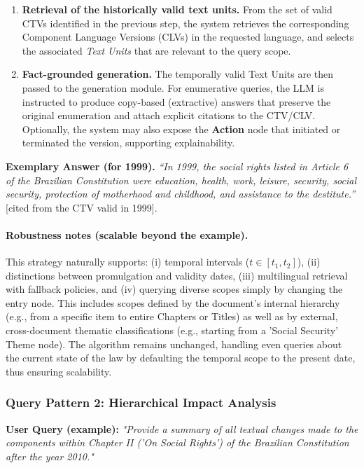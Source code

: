 \documentclass[11pt]{article}
\begin{document}
\begin{enumerate}
\item \textbf{Retrieval of the historically valid text units.}
From the set of valid CTVs identified in the previous step, the system retrieves the corresponding Component Language Versions (CLVs) in the requested language, and selects the associated \textit{Text Units} that are relevant to the query scope.

\item \textbf{Fact-grounded generation.}
The temporally valid Text Units are then passed to the generation module. For enumerative queries, the LLM is instructed to produce copy-based (extractive) answers that preserve the original enumeration and attach explicit citations to the CTV/CLV. Optionally, the system may also expose the \textbf{Action} node that initiated or terminated the version, supporting explainability.
\end{enumerate}

\noindent\textbf{Exemplary Answer (for 1999).}
\textit{``In 1999, the social rights listed in Article 6 of the Brazilian Constitution were education, health, work, leisure, security, social security, protection of motherhood and childhood, and assistance to the destitute.''}
[cited from the CTV valid in 1999].

\paragraph{Robustness notes (scalable beyond the example).}
This strategy naturally supports: (i) temporal intervals ($t \in [t_1,t_2]$), (ii) distinctions between promulgation and validity dates, (iii) multilingual retrieval with fallback policies, and (iv) querying diverse scopes simply by changing the entry node. This includes scopes defined by the document's internal hierarchy (e.g., from a specific item to entire Chapters or Titles) as well as by external, cross-document thematic classifications (e.g., starting from a 'Social Security' Theme node). The algorithm remains unchanged, handling even queries about the current state of the law by defaulting the temporal scope to the present date, thus ensuring scalability.

\subsubsection*{Query Pattern 2: Hierarchical Impact Analysis}
\textbf{User Query (example):} \textit{"Provide a summary of all textual changes made to the components within Chapter II ('On Social Rights') of the Brazilian Constitution after the year 2010."}
\end{document}
